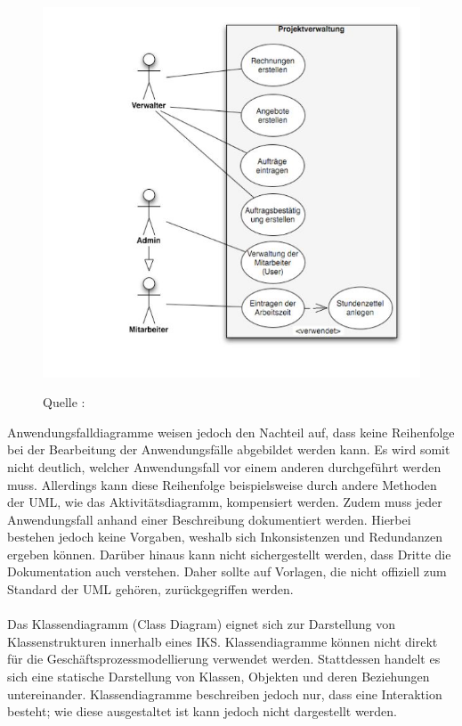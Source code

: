 \begin{center}
\begin{figure}[h]
   

\includegraphics[scale=0.8]{Graphics/Anwendungsdiagram.jpg} 



Quelle : \cite{MT005}

\label{fig2}


\end{figure}
\end{center}
\newpage
Anwendungsfalldiagramme weisen jedoch den Nachteil auf, dass keine Reihenfolge bei der Bearbeitung der Anwendungsfälle abgebildet werden kann. Es wird somit nicht deutlich, welcher Anwendungsfall vor einem anderen durchgeführt werden muss. Allerdings kann diese Reihenfolge beispielsweise durch andere Methoden der UML, wie das Aktivitätsdiagramm, kompensiert werden. Zudem muss jeder Anwendungsfall anhand einer Beschreibung dokumentiert werden. Hierbei bestehen jedoch keine Vorgaben, weshalb sich Inkonsistenzen und Redundanzen ergeben können. Darüber hinaus kann nicht sichergestellt werden, dass Dritte die Dokumentation auch verstehen. Daher sollte auf Vorlagen, die nicht offiziell zum Standard der UML gehören, zurückgegriffen werden.\cite{MT005} \\
\\
\newpage
Das Klassendiagramm (Class Diagram) eignet sich zur Darstellung von Klassenstrukturen innerhalb eines IKS. Klassendiagramme können nicht direkt für die Geschäftsprozessmodellierung verwendet werden. Stattdessen handelt es sich eine statische Darstellung von Klassen, Objekten und deren Beziehungen untereinander. Klassendiagramme beschreiben jedoch nur, dass eine Interaktion besteht; wie diese ausgestaltet ist kann jedoch nicht dargestellt werden.\\

